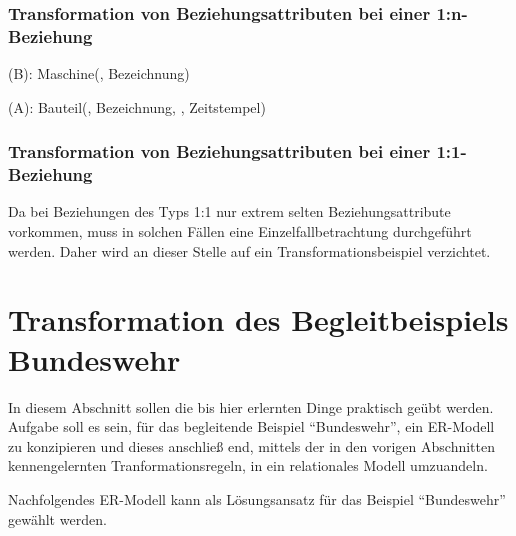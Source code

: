 \subsubsection{Transformation von Beziehungsattributen bei einer 1:n-Beziehung}
\begin{center}
\end{center}
\begin{small}
    (B): Maschine(, Bezeichnung)

    (A): Bauteil(, Bezeichnung, , Zeitstempel)
\end{small}
\subsubsection{Transformation von Beziehungsattributen bei einer 1:1-Beziehung}
Da bei Beziehungen des Typs 1:1 nur extrem selten Beziehungsattribute vorkommen, muss in solchen Fällen eine Einzelfallbetrachtung durchgeführt werden. Daher wird an dieser Stelle auf ein Transformationsbeispiel verzichtet.
\clearpage
\section{Transformation des Begleitbeispiels Bundeswehr}
In diesem Abschnitt sollen die bis hier erlernten Dinge praktisch geübt werden. Aufgabe soll es sein, für das begleitende Beispiel \enquote{Bundeswehr}, ein ER-Modell zu konzipieren und dieses anschließ end, mittels der in den vorigen Abschnitten kennengelernten Tranformationsregeln, in ein relationales Modell umzuandeln.

Nachfolgendes ER-Modell kann als Lösungsansatz für das Beispiel \enquote{Bundeswehr} gewählt werden.

